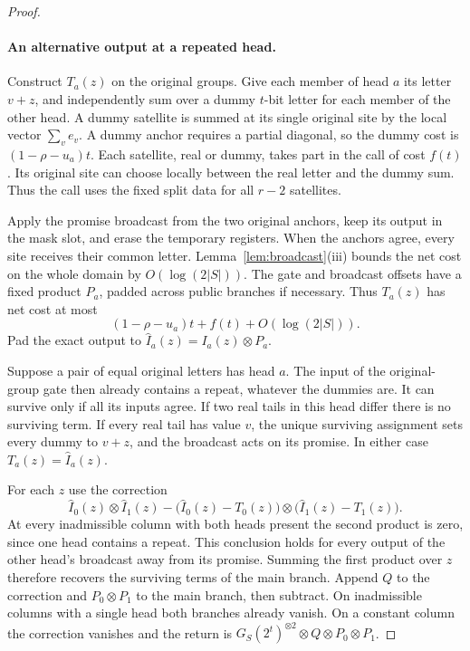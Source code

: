 \begin{proof}
\paragraph{An alternative output at a repeated head.}
Construct \(T_a(z)\) on the original groups. Give each member of head
\(a\) its letter \(v+z\), and independently sum over a dummy \(t\)-bit
letter for each member of the other head. A dummy satellite is summed
at its single original site by the local vector \(\sum_v e_v\).
A dummy anchor requires a partial diagonal, so the dummy cost is
\((1-\rho-u_a)t\). Each satellite, real or dummy, takes part in the
call of cost \(f(t)\). Its original site can choose locally between
the real letter and the dummy sum. Thus the call uses the fixed split
data for all \(r-2\) satellites.

Apply the promise broadcast from the two original anchors, keep its
output in the mask slot, and erase the temporary registers. When the
anchors agree, every site receives their common letter.
Lemma~\ref{lem:broadcast}(iii) bounds the net cost on the whole
domain by \(O(\log(2|S|))\). The gate and broadcast offsets have a fixed
product \(P_a\), padded across public branches if necessary.
Thus \(T_a(z)\) has net cost at most
\[
       (1-\rho-u_a)t+f(t)+O(\log(2|S|)).
\]
Pad the exact output to \(\widehat I_a(z)=I_a(z)\otimes P_a\).

Suppose a pair of equal original letters has head \(a\). The input
of the original-group gate then already contains a repeat, whatever
the dummies are. It can survive only if all its inputs agree.
If two real tails in this head differ there is no surviving term.
If every real tail has value \(v\), the unique surviving assignment
sets every dummy to \(v+z\), and the broadcast acts on its promise.
In either case \(T_a(z)=\widehat I_a(z)\).

For each \(z\) use the correction
\[
 \widehat I_0(z)\otimes\widehat I_1(z)
 -
 \big(\widehat I_0(z)-T_0(z)\big)\otimes
 \big(\widehat I_1(z)-T_1(z)\big).
\]
At every inadmissible column with both heads present the second
product is zero, since one head contains a repeat. This conclusion
holds for every output of the other head's broadcast away from its
promise. Summing the first product over \(z\) therefore recovers
the surviving terms of the main branch. Append \(Q\) to the
correction and \(P_0\otimes P_1\) to the main branch, then subtract.
On inadmissible columns with a single head both branches already
vanish. On a constant column the correction vanishes and the return
is \(G_S(2^t)^{\otimes2}\otimes Q\otimes P_0\otimes P_1\).


\end{proof}
